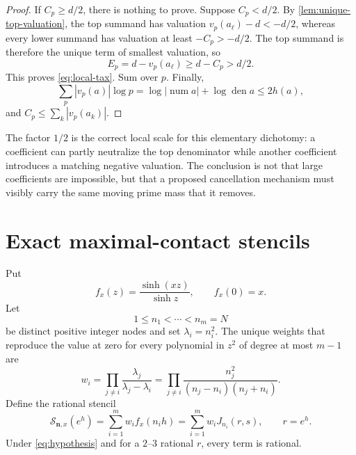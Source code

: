 \documentclass[11pt]{article}
\theoremstyle{definition}
\begin{document}
\begin{proof}
If $C_p\ge d/2$, there is nothing to prove.  Suppose $C_p<d/2$.
By \cref{lem:unique-top-valuation}, the top summand has valuation
$v_p(a_\ell)-d<-d/2$, whereas every lower summand has valuation at least
$-C_p>-d/2$.  The top summand is therefore the unique term of smallest
valuation, so
\[
 E_p=d-v_p(a_\ell)\ge d-C_p>d/2.
\]
This proves \eqref{eq:local-tax}.  Sum over $p$.  Finally,
\[
 \sum_p|v_p(a)|\log p
 =\log|\operatorname{num}a|+\log\operatorname{den}a
 \le2h(a),
\]
and $C_p\le\sum_k|v_p(a_k)|$.
\end{proof}

The factor $1/2$ is the correct local scale for this elementary dichotomy: a
coefficient can partly neutralize the top denominator while another
coefficient introduces a matching negative valuation.  The conclusion is not
that large coefficients are impossible, but that a proposed cancellation
mechanism must visibly carry the same moving prime mass that it removes.

\section{Exact maximal-contact stencils}
\label{sec:stencils}

Put
\begin{equation}
 f_x(z)=\frac{\sinh(xz)}{\sinh z},\qquad f_x(0)=x.
 \label{eq:fx}
\end{equation}
Let
\[
 1\le n_1<\cdots<n_m=N
\]
be distinct positive integer nodes and set $\lambda_i=n_i^2$.  The unique
weights that reproduce the value at zero for every polynomial in $z^2$ of
degree at most $m-1$ are
\begin{equation}
 w_i=\prod_{j\ne i}\frac{\lambda_j}{\lambda_j-\lambda_i}
 =\prod_{j\ne i}\frac{n_j^2}{(n_j-n_i)(n_j+n_i)}.
 \label{eq:general-weights}
\end{equation}
Define the rational stencil
\begin{equation}
 \mathcal S_{\mathbf n,x}(e^h)
 =\sum_{i=1}^m w_i f_x(n_i h)
 =\sum_{i=1}^m w_i J_{n_i}(r,s),
 \qquad r=e^h.
 \label{eq:general-stencil}
\end{equation}
Under \eqref{eq:hypothesis} and for a $2$--$3$ rational $r$, every term is
rational.
\end{document}
